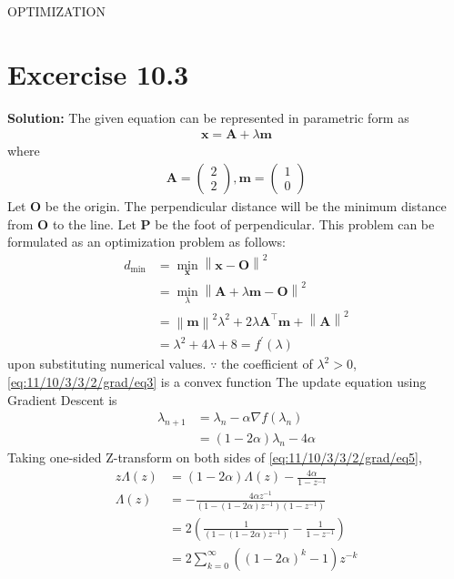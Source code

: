\documentclass[12pt]{article}
\providecommand{\brak}[1]{\ensuremath{\left(#1\right)}}
\providecommand{\norm}[1]{\left\lVert#1\right\rVert}
\newcommand{\solution}{\noindent \textbf{Solution: }}
\newcommand{\myvec}[1]{\ensuremath{\begin{pmatrix}#1\end{pmatrix}}}
\let\vec\mathbf
\begin{document}
\begin{center}
\textbf\large{OPTIMIZATION}

\end{center}
\section*{Excercise 10.3}


\solution
\fi
The given equation can be represented in parametric form as
\begin{align}
	\label{eq:11/10/3/3/2/grad/eq2}
	\vec{x} = \vec{A}+\lambda\vec{m}
\end{align}
where
\begin{align}
	\vec{A} = \myvec{2\\2}, \vec{m} = \myvec{1\\0}
	\label{eq:11/10/3/3/2/grad/line}
\end{align}
Let $\vec{O}$ be the origin. The perpendicular distance will be the minimum distance from $\vec{O}$ to the line. Let $\vec{P}$ be the foot of perpendicular. This problem can be formulated as an optimization problem as follows:
\begin{align}
	d_{\min} &= 	 \min_{\vec{x}}\norm{\vec{x}-\vec{O}}^2\\
	 &= \min_{\lambda}\norm{\vec{A}+\lambda\vec{m}-\vec{O}}^2\\
	&= \norm{\vec{m}}^2\lambda^2+2\lambda\vec{A}^\top\vec{m}+\norm{\vec{A}}^2
	\label{eq:11/10/3/3/2/grad/eq3}
	\\
	&= \lambda^2+4\lambda+8 = f^\prime\brak{\lambda} 
	\label{eq:11/10/3/3/2/grad/eq4}
\end{align}
upon substituting numerical values.
$\because$ the coefficient of $\lambda^2>0$, \eqref{eq:11/10/3/3/2/grad/eq3} is a convex function
The update equation using Gradient Descent is
\begin{align}
	\lambda_{n+1} &= \lambda_n - \alpha\nabla f\brak{\lambda_n}\\
	\label{eq:11/10/3/3/2/grad/eq5}
 &= \brak{1-2\alpha}\lambda_{n} - 4\alpha
\end{align}
Taking one-sided Z-transform on both sides of \eqref{eq:11/10/3/3/2/grad/eq5},
\begin{align}
	z\Lambda\brak{z} &= \brak{1-2\alpha}\Lambda\brak{z} - \frac{4\alpha}{1-z^{-1}}\\
	\Lambda\brak{z} &= -\frac{4\alpha z^{-1}}{\brak{1-\brak{1-2\alpha}z^{-1}}\brak{1-z^{-1}}}\\
	&= 2\brak{\frac{1}{\brak{1-\brak{1-2\alpha}z^{-1}}}-\frac{1}{1-z^{-1}}}\\
	\label{eq:11/10/3/3/2/grad/eq6}
	&= 2\sum_{k=0}^{\infty}\brak{\brak{1-2\alpha}^{k}-1}z^{-k}
\end{align}
\end{document}
